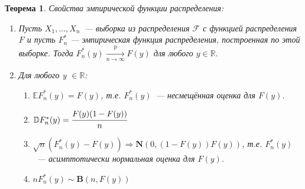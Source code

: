 \documentclass[oneside,final,14pt]{extreport}
\newtheorem{thm}{Теорема}[section]
\theoremstyle{definition}
\begin{document}
\begin{thm} Свойства эмпирической функции распределения:
\begin{enumerate}
    \item Пусть $X_{1}, \ldots, X_{n}$~--- выборка из распределения $\mathcal{F}$ с функцией распределения $F$ и пусть $F_{n}^{*}$ — эмпирическая функция распределения, построенная по этой выборке. Тогда $F_{n}^{*}(y) \xrightarrow[n \to \infty]{\mathrm{p}} F(y)$ для любого $y \in \mathbb{R}.$
    \item Для любого y $\in \mathbb{R}$:
    \begin{enumerate}[label={\arabic*)}]
        \item $\mathbb{E} F_{n}^{*}(y)=F(y)$, т.е. $F_{n}^{*}(y)$~--- несмещённая оценка для $F(y)$.
        \item $\mathbb{D} F_{n}^{*}(y)=\cfrac{F(y)(1-F(y))}{n}$
        \item $\sqrt{n}(F_{n}^{*}(y)-F(y)) \Rightarrow \mathbf{N}(0, (1-F(y))F(y))$, т.е. $F_{n}^{*}(y)$~--- асимптотически нормальная оценка для $F(y)$.
        \item $n F_{n}^{*}(y) \sim \mathbf{B}(n, F(y))$
    \end{enumerate}
\end{enumerate}
\end{thm}
\pagebreak
\end{document}
